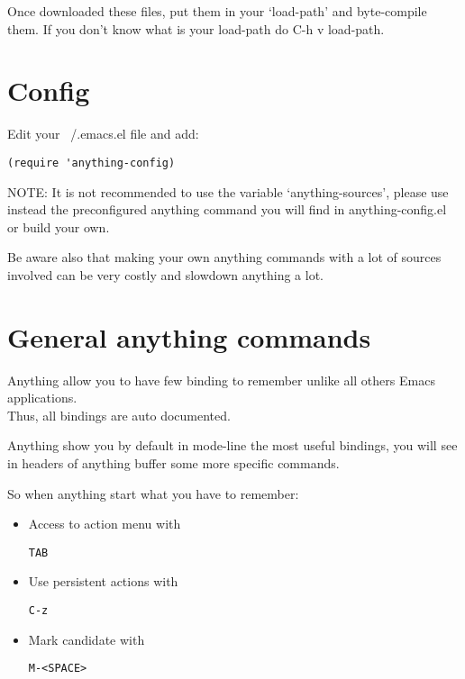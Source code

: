 \documentclass[a4paper,11pt]{article}
\begin{document}
Once downloaded these files, put them in your `load-path' and byte-compile them.
If you don't know what is your load-path do C-h v load-path.

\section{Config}
\label{sec:config}
Edit your ~/.emacs.el file and add:

\begin{verbatim}
(require 'anything-config)
\end{verbatim}


NOTE:
It is not recommended to use the variable `anything-sources', please use instead the preconfigured anything command
you will find in anything-config.el or build your own.

Be aware also that making your own anything commands with a lot of sources involved can be very costly and slowdown
anything a lot.

\section{General anything commands}
\label{sec:gener-anyth-comm}
Anything allow you to have few binding to remember unlike all others Emacs applications.\\
Thus, all bindings are auto documented.

Anything show you by default in mode-line the most useful bindings, you will see in headers of anything buffer some more specific
commands.

So when anything start what you have to remember:

\begin{itemize}
\item Access to action menu with 
\begin{verbatim}
TAB
\end{verbatim}
\end{itemize}
\begin{itemize}
\item Use persistent actions with
\begin{verbatim}
C-z
\end{verbatim}
\end{itemize}
\begin{itemize}
\item Mark candidate with
\begin{verbatim}
M-<SPACE>
\end{verbatim}
\end{itemize}
\end{document}
